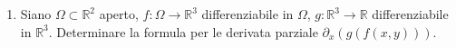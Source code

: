 \begin{enumerate}
	\item Siano $\Omega \subset \mathbb{R}^2$ aperto, $f: \Omega \to \mathbb{R}^3$ differenziabile in $\Omega$, $g: \mathbb{R}^3 \to \mathbb{R}$ differenziabile in $\mathbb{R}^3$. Determinare la formula per le derivata parziale $\partial_x(g(f(x,y)))$.
\end{enumerate}